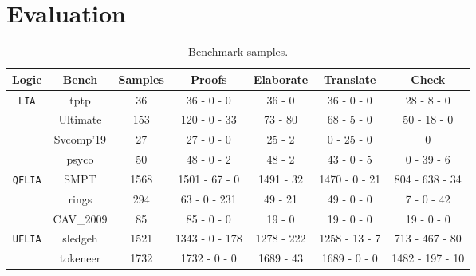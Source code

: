 \section{Evaluation}
\label{sec:evaluation}

\begin{table}[]
\centering
\begin{tabular}{|c|c|c|c|c|c|c|}
\hline                                                             %
\textbf{Logic}                & \textbf{Bench}  & \textbf{Samples} & \textbf{Proofs}       & \textbf{Elaborate} & \textbf{Translate} & \textbf{Check} \\ \hline
\multirow{4}{*}{\tt{LIA}}     & tptp            & 36               &  36 - 0 - 0           &  36 - 0             & 36 - 0 - 0          & 28 - 8 - 0       \\ \cline{2-7} 
                              & Ultimate        & 153              &  120 - 0 - 33         &  73 - 80            & 68 - 5 - 0          & 50 - 18 - 0      \\ \cline{2-7} 
                              & Svcomp'19      & 27               &  27 - 0 - 0           &  25 - 2             & 0 - 25 - 0          & 0                \\ \cline{2-7} 
                              & psyco           & 50               &  48 - 0 - 2           &  48 - 2             & 43 - 0 - 5          & 0 - 39 - 6       \\ \hline
\multirow{2}{*}{\tt{QFLIA}}   & SMPT            & 1568             &  1501 - 67 - 0        &  1491 - 32          & 1470 - 0 - 21       & 804 - 638 - 34   \\ \cline{2-7}
                              & rings           & 294              &  63 - 0 - 231         &  49 - 21            & 49 - 0 - 0          & 7 - 0 - 42       \\ \cline{2-7} 
                              & CAV\_2009       & 85               &  85 - 0 - 0           &  19 - 0             & 19 - 0 - 0          & 19 - 0 - 0       \\ \hline
\multirow{2}{*}{\tt{UFLIA}}   & sledgeh    & 1521             &  1343 - 0 - 178       &  1278 - 222         & 1258 - 13 - 7       & 713 - 467 - 80   \\ \cline{2-7} 
                              & tokeneer        & 1732             &  1732 - 0 - 0         & 1689 - 43           & 1689 - 0 - 0        & 1482 - 197 - 10  \\ \hline
\end{tabular}
\caption{Benchmark samples.}
\label{table:benchmarks-description}
\end{table}


